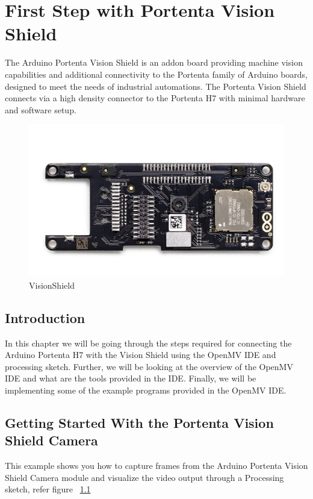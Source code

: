 \chapter{First Step with Portenta Vision Shield}

The Arduino Portenta Vision Shield is an addon board providing machine vision capabilities and additional connectivity to the Portenta family of Arduino boards, designed to meet the needs of industrial automations. The Portenta Vision Shield connects via a high density connector to the Portenta H7 with minimal hardware and software setup.

\begin{figure}
	\begin{center}
		\includegraphics[width=0.7\linewidth]{Images/VisionShield/VisionShield.png}
		\caption{VisionShield}
		\label{VisionShield}
	\end{center}
\end{figure}

\section{Introduction}
In this chapter we will be going through the steps required for connecting the 
Arduino Portenta H7 with the Vision Shield using the OpenMV IDE and processing sketch.
Further, we will be looking at the overview of the OpenMV IDE
and what are the tools provided in the IDE. Finally, we will be implementing some of
the example programs provided in the OpenMV IDE. \cite{portentaH7visionshield:2024}

\section{Getting Started With the Portenta Vision Shield Camera}
This example shows you how to capture frames from the Arduino Portenta Vision Shield Camera module and visualize the video output through a Processing sketch, refer figure ~\ref{VisionShield} \cite{portentaVisionShieldCamera:2024}

